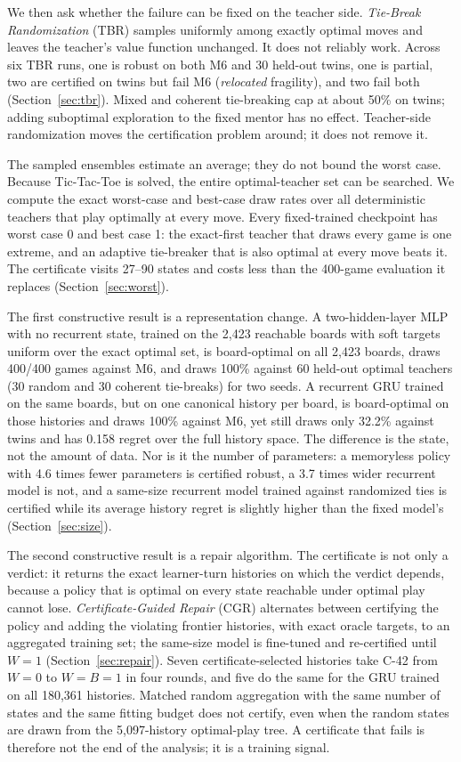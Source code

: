 \documentclass[conference]{IEEEtran}
\begin{document}
We then ask whether the failure can be fixed on the teacher side. \emph{Tie-Break Randomization} (TBR) samples uniformly among exactly optimal moves and leaves the teacher's value function unchanged. It does not reliably work. Across six TBR runs, one is robust on both M6 and 30 held-out twins, one is partial, two are certified on twins but fail M6 (\emph{relocated} fragility), and two fail both (Section~\ref{sec:tbr}). Mixed and coherent tie-breaking cap at about 50\% on twins; adding suboptimal exploration to the fixed mentor has no effect. Teacher-side randomization moves the certification problem around; it does not remove it.

The sampled ensembles estimate an average; they do not bound the worst case. Because Tic-Tac-Toe is solved, the entire optimal-teacher set can be searched. We compute the exact worst-case and best-case draw rates over all deterministic teachers that play optimally at every move. Every fixed-trained checkpoint has worst case 0 and best case 1: the exact-first teacher that draws every game is one extreme, and an adaptive tie-breaker that is also optimal at every move beats it. The certificate visits 27--90 states and costs less than the 400-game evaluation it replaces (Section~\ref{sec:worst}).

The first constructive result is a representation change. A two-hidden-layer MLP with no recurrent state, trained on the 2{,}423 reachable boards with soft targets uniform over the exact optimal set, is board-optimal on all 2{,}423 boards, draws 400/400 games against M6, and draws 100\% against 60 held-out optimal teachers (30 random and 30 coherent tie-breaks) for two seeds. A recurrent GRU trained on the same boards, but on one canonical history per board, is board-optimal on those histories and draws 100\% against M6, yet still draws only 32.2\% against twins and has 0.158 regret over the full history space. The difference is the state, not the amount of data. Nor is it the number of parameters: a memoryless policy with 4.6 times fewer parameters is certified robust, a 3.7 times wider recurrent model is not, and a same-size recurrent model trained against randomized ties is certified while its average history regret is slightly higher than the fixed model's (Section~\ref{sec:size}).

The second constructive result is a repair algorithm. The certificate is not only a verdict: it returns the exact learner-turn histories on which the verdict depends, because a policy that is optimal on every state reachable under optimal play cannot lose. \emph{Certificate-Guided Repair} (CGR) alternates between certifying the policy and adding the violating frontier histories, with exact oracle targets, to an aggregated training set; the same-size model is fine-tuned and re-certified until $W=1$ (Section~\ref{sec:repair}). Seven certificate-selected histories take C-42 from $W=0$ to $W=B=1$ in four rounds, and five do the same for the GRU trained on all 180{,}361 histories. Matched random aggregation with the same number of states and the same fitting budget does not certify, even when the random states are drawn from the 5{,}097-history optimal-play tree. A certificate that fails is therefore not the end of the analysis; it is a training signal.
\end{document}
